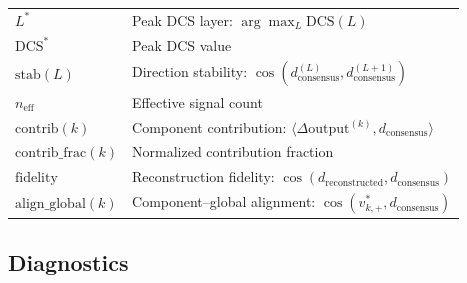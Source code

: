 \documentclass[11pt]{article}
\begin{document}
\begin{center}
\begin{tabular}{ll}
$L^*$ & Peak DCS layer: $\arg\max_L \text{DCS}(L)$ \\
$\text{DCS}^*$ & Peak DCS value \\
$\text{stab}(L)$ & Direction stability: $\cos(d^{(L)}_{\text{consensus}}, d^{(L+1)}_{\text{consensus}})$ \\
$n_{\text{eff}}$ & Effective signal count \\
$\text{contrib}(k)$ & Component contribution: $\langle \Delta\text{output}^{(k)}, d_{\text{consensus}} \rangle$ \\
$\text{contrib\_frac}(k)$ & Normalized contribution fraction \\
$\text{fidelity}$ & Reconstruction fidelity: $\cos(d_{\text{reconstructed}}, d_{\text{consensus}})$ \\
$\text{align\_global}(k)$ & Component--global alignment: $\cos(v^*_{k,+}, d_{\text{consensus}})$ \\
\bottomrule
\end{tabular}
\end{center}

\subsection{Diagnostics}
\label{app:notation-diagnostics}
\end{document}
